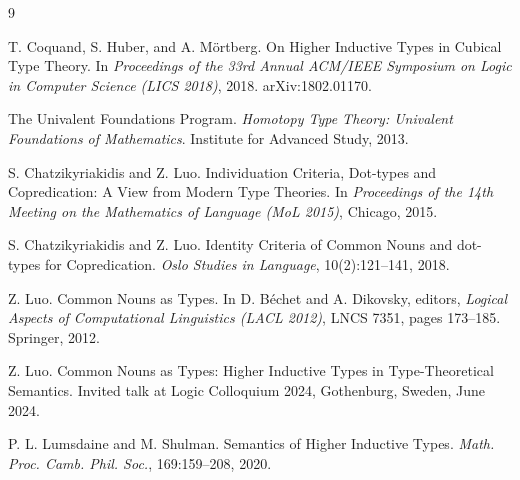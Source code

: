 \documentclass[11pt]{article}
\begin{document}
\begin{thebibliography}{9}

T. Coquand, S. Huber, and A. M{\"o}rtberg.
\newblock On Higher Inductive Types in Cubical Type Theory.
\newblock In \emph{Proceedings of the 33rd Annual ACM/IEEE Symposium on Logic
in Computer Science (LICS 2018)}, 2018.
\newblock arXiv:1802.01170.

The Univalent Foundations Program.
\newblock \emph{Homotopy Type Theory: Univalent Foundations of Mathematics}.
\newblock Institute for Advanced Study, 2013.

S. Chatzikyriakidis and Z. Luo.
\newblock Individuation Criteria, Dot-types and Copredication: A View from
Modern Type Theories.
\newblock In \emph{Proceedings of the 14th Meeting on the Mathematics of
Language (MoL 2015)}, Chicago, 2015.

S. Chatzikyriakidis and Z. Luo.
\newblock Identity Criteria of Common Nouns and dot-types for Copredication.
\newblock \emph{Oslo Studies in Language}, 10(2):121--141, 2018.

Z. Luo.
\newblock Common Nouns as Types.
\newblock In D. B{\'e}chet and A. Dikovsky, editors, \emph{Logical Aspects of
Computational Linguistics (LACL 2012)}, LNCS 7351, pages 173--185. Springer,
2012.

Z. Luo.
\newblock Common Nouns as Types: Higher Inductive Types in Type-Theoretical
Semantics.
\newblock Invited talk at Logic Colloquium 2024, Gothenburg, Sweden, June 2024.

P. L. Lumsdaine and M. Shulman.
\newblock Semantics of Higher Inductive Types.
\newblock \emph{Math. Proc. Camb. Phil. Soc.}, 169:159--208, 2020.

\end{thebibliography}
\end{document}
